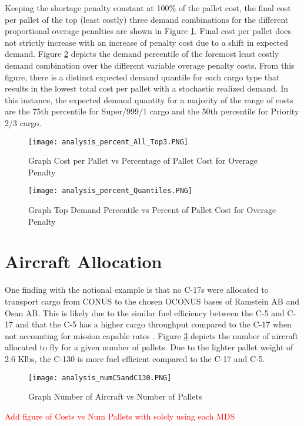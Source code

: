 Keeping the shortage penalty constant at 100\% of the pallet cost, the final cost per pallet of the top (least costly) three demand combinations for the different proportional overage penalties are shown in Figure \ref{fig_GraphAllPercent}. Final cost per pallet does not strictly increase with an increase of penalty cost due to a shift in expected demand. Figure \ref{fig_Graph_PercentQuantiles} depicts the demand percentile of the foremost least costly demand combination over the different variable overage penalty costs. From this figure, there is a distinct expected demand quantile for each cargo type that results in the lowest total cost per pallet with a stochastic realized demand. In this instance, the expected demand quantity for a majority of the range of costs are the 75th percentile for Super/999/1 cargo and the 50th percentile for Priority 2/3 cargo.     

\begin{figure}[H]
\centering
\texttt{[image: analysis\_percent\_All\_Top3.PNG]}
\caption{Graph Cost per Pallet vs Percentage of Pallet Cost for Overage Penalty}
\label{fig_GraphAllPercent}
\end{figure}

\begin{figure}[H]
\centering
\texttt{[image: analysis\_percent\_Quantiles.PNG]}
\caption{Graph Top Demand Percentile vs Percent of Pallet Cost for Overage Penalty}
\label{fig_Graph_PercentQuantiles}
\end{figure}

\section{Aircraft Allocation}
One finding with the notional example is that no C-17s were allocated to transport cargo from CONUS to the chosen OCONUS bases of Ramstein AB and Osan AB. This is likely due to the similar fuel efficiency between the C-5 and C-17 and that the C-5 has a higher cargo throughput compared to the C-17 when not accounting for mission capable rates \cite{Reiman2014}. Figure \ref{fig_numAircraft} depicts the number of aircraft allocated to fly for a given number of pallets.  Due to the lighter pallet weight of 2.6 Klbs, the C-130 is more fuel efficient compared to the C-17 and C-5.
\begin{figure}[H]
\centering
\texttt{[image: analysis\_numC5andC130.PNG]}
\caption{Graph Number of Aircraft vs Number of Pallets}
\label{fig_numAircraft}
\end{figure}

\textcolor{red}{Add figure of Costs vs Num Pallets with solely using each MDS}
